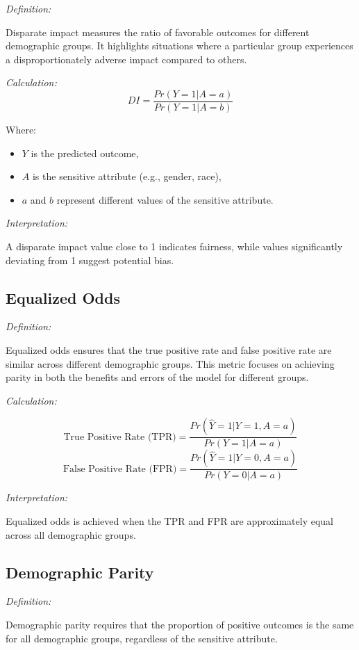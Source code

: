 \documentclass[12pt,a4paper,openright,twoside]{book}
\begin{document}
\emph{Definition:}

Disparate impact measures the ratio of favorable outcomes for different demographic groups. It highlights situations where a particular group experiences a disproportionately adverse impact compared to others.

\emph{Calculation:}
\[ DI = \frac{Pr(Y = 1|A=a)}{Pr(Y = 1|A=b)} \]

Where:
\begin{itemize}
    \item \( Y \) is the predicted outcome,
    \item \( A \) is the sensitive attribute (e.g., gender, race),
    \item \( a \) and \( b \) represent different values of the sensitive attribute.
\end{itemize}

\emph{Interpretation:}

A disparate impact value close to 1 indicates fairness, while values significantly deviating from 1 suggest potential bias.

\subsection{Equalized Odds}

\emph{Definition:}

Equalized odds ensures that the true positive rate and false positive rate are similar across different demographic groups. This metric focuses on achieving parity in both the benefits and errors of the model for different groups.

\emph{Calculation:}

\[ \text{True Positive Rate (TPR)} = \frac{Pr(\hat{Y} = 1|Y = 1, A = a)}{Pr(Y = 1|A = a)} \]
\[ \text{False Positive Rate (FPR)} = \frac{Pr(\hat{Y} = 1|Y = 0, A = a)}{Pr(Y = 0|A = a)} \]

\emph{Interpretation:}

Equalized odds is achieved when the TPR and FPR are approximately equal across all demographic groups.

\subsection{Demographic Parity}

\emph{Definition:}

Demographic parity requires that the proportion of positive outcomes is the same for all demographic groups, regardless of the sensitive attribute.
\end{document}
